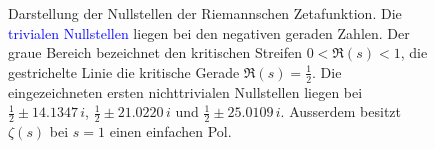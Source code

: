\begin{figure}
%		
%		
%		
%		
%		
%		
	
	\caption{
		Darstellung der Nullstellen der Riemannschen Zetafunktion.
		Die \textcolor{blue}{trivialen Nullstellen} liegen bei den negativen geraden Zahlen.
		Der graue Bereich bezeichnet den kritischen Streifen \(0<\Re(s)<1\),
		die gestrichelte Linie die kritische Gerade \(\Re(s)=\tfrac12\).
		Die eingezeichneten ersten \textcolor{green!70!black}{nichttrivialen Nullstellen} liegen bei
		\(\tfrac12 \pm 14.1347\,i\),
		\(\tfrac12 \pm 21.0220\,i\) und
		\(\tfrac12 \pm 25.0109\,i\).
		Ausserdem besitzt \(\zeta(s)\) bei \(s=1\) einen einfachen Pol.
	}
	\label{hankel:fig:nullstellen}
\end{figure}

